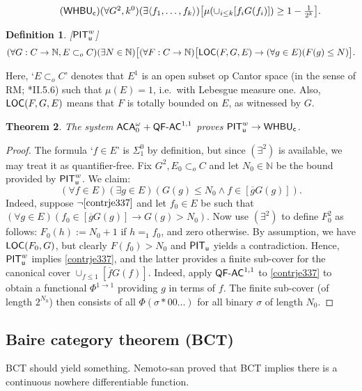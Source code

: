 \documentclass[reqno]{amsart}
\newtheorem{thm}{Theorem}
\newtheorem{defi}[thm]{Definition}
\newcommand\be{\begin{equation}}
\newcommand\ee{\end{equation}}
\def\bdefi{\begin{defi}\rm}
\def\edefi{\end{defi}}
\def\LOC{\textup{\textsf{LOC}}}
\def\PIT{\textup{\textsf{PIT}}}
\def\PR{\textup{\textsf{PR}}}
\def\u{\textup{\textsf{u}}}
\def\c{\textup{\textsf{c}}}
\def\bye{\end{document}}
\def\N{{\mathbb  N}}
\def\di{\rightarrow}
\def\asa{\leftrightarrow}
\def\ACA{\textup{\textsf{ACA}}}
\def\QFAC{\textup{\textsf{QF-AC}}}
\def\HBU{\textup{\textsf{HBU}}}
\def\WHBU{\textup{\textsf{WHBU}}}
\def\SCF{\textup{\textsf{SCF}}}
\numberwithin{equation}{section}
\numberwithin{thm}{section}
\begin{document}
\be\tag{$\WHBU_{\c}$}\textstyle
(\forall G^{2}, k^{0})(\exists \langle f_{1}, \dots, f_{k} \rangle )\big[ \mu(\cup_{i\leq k} [f_{i}G(f_{i})])\geq 1-\frac{1}{2^{k}}  \big].
\ee
\bdefi[$\PIT_{\u}^{w}$]
\[
(\forall G:C\di \N, E \subset_{o} C)(\exists N\in \N )\big[ (\forall F:C\di \N)\big[  \LOC(F, G, E)\di (\forall g \in E)(F(g)\leq N)\big].
\]
\edefi
Here, `$E\subset_{o}C$' denotes that $E^{1}$ is an open subset op Cantor space (in the sense of RM; \cite{simpson2}*{II.5.6}) such that $\mu(E)=1$, i.e.\ with Lebesgue measure one. 
Also, $\LOC(F, G, E)$ means that $F$ is totally bounded on $E$, as witnessed by $G$.  
\begin{thm}\label{krooi2} 
The system $\ACA_{0}^{\omega}+\QFAC^{1,1}$ proves $\PIT_{\u}^{w}\di \WHBU_{\c}$. 
\end{thm}
\begin{proof}
The formula `$f\in E$' is $\Sigma_{1}^{0}$ by definition, but since $(\exists^{2})$ is available, we may treat it as quantifier-free.  
Fix $G^{2}, E_{0}\subset_{o}C$ and let $N_{0}\in \N$ be the bound provided by $\PIT_{\u}^{w}$.  
We claim:
\be\label{contrje337}
(\forall f\in E)(\exists g\in E)(G(g)\leq N_{0}\wedge f\in[ \overline{g}G(g)]).
\ee
Indeed, suppose $\neg\eqref{contrje337}$ and let $f_{0}\in E$ be such that $(\forall g\in E)( f_{0}\in [\overline{g}G(g)]\di G(g)> N_{0})$.
Now use $(\exists^{2})$ to define $F_{0}^{2}$ as follows: $F_{0}(h):=N_{0}+1$ if $h=_{1}f_{0}$, and zero otherwise.   
By assumption, we have $\LOC(F_{0}, G)$, but clearly $F(f_{0})>N_{0}$ and $\PIT_{\u}$ yields a contradiction.  
Hence, $\PIT_{\u}^{w}$ implies \eqref{contrje337}, and the latter provides a finite sub-cover for the canonical cover $\cup_{f\leq 1}[\overline{f}G(f)]$.  
Indeed, apply $\QFAC^{1,1}$ to \eqref{contrje337} to obtain a functional $\Phi^{1\di 1}$ providing $g$ in terms of $f$.  
The finite sub-cover (of length $2^{N_{0}}$) then consists of all $\Phi(\sigma*00\dots)$ for all binary $\sigma$ of length $N_{0}$.  
% 
%
\end{proof}
\subsection{Baire category theorem (BCT)}
BCT should yield something.  Nemoto-san proved that BCT implies there is a continuous nowhere differentiable function. 



\bye
\end{document}
